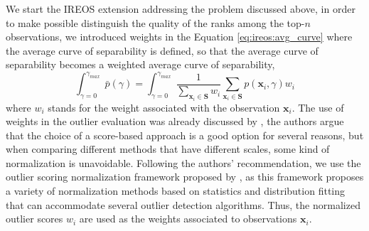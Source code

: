 We start the IREOS extension addressing the problem discussed above, in order to make possible distinguish the quality of the ranks among the top-$n$ observations, we introduced weights in the Equation \ref{eq:ireos:avg_curve} where the average curve of separability is defined, so that the average curve of separability becomes a weighted average curve of separability,
\begin{equation}
\int_{\gamma = 0}^{\gamma_{max}} \bar{p}(\gamma) = \int_{\gamma = 0}^{\gamma_{max}} \frac{1}{\sum_{\mathbf{x}_i \in \mathbf{S}} w_i} \sum_{\mathbf{x}_i \in \mathbf{S}} p(\mathbf{x}_i, \gamma) w_i
\label{eq:w_avg_sep}
\end{equation}
where $w_i$ stands for the weight associated with the observation $\mathbf{x}_i$. The use of weights in the outlier evaluation was already discussed by \cite{schubert2012}, the authors argue that the choice of a score-based approach is a good option for several reasons, but when comparing different methods that have different scales, some kind of normalization is unavoidable. Following the authors' recommendation, we use the outlier scoring normalization framework proposed by \cite{kriegel2011}, as this framework proposes a variety of normalization methods based on statistics and distribution fitting that can accommodate several outlier detection algorithms. Thus, the normalized outlier scores $w_i$ are used as the weights associated to observations $\mathbf{x}_i$.


